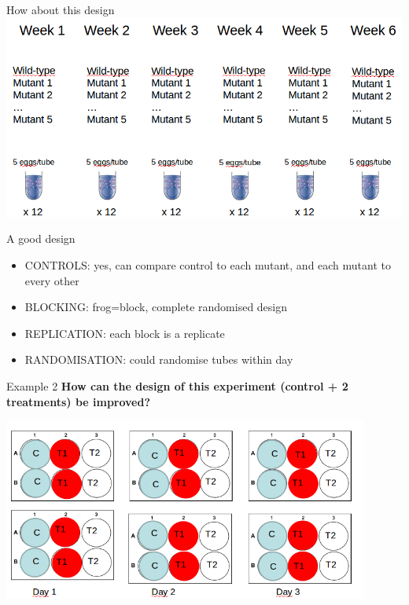 \documentclass[10pt]{beamer}
\begin{document}
\begin{frame}{How about this design}
 \includegraphics[width=\textwidth]{Figures/expdes4}
\end{frame}


\begin{frame}{A good design}
 \begin{alertblock}{}
 \begin{itemize}
  \item CONTROLS: yes, can compare control to each mutant, and each mutant to every other
  \item BLOCKING: frog=block, complete randomised design
  \item REPLICATION: each block is a replicate
  \item RANDOMISATION: could randomise tubes within day
 \end{itemize}
 \end{alertblock}
 
\end{frame}

\begin{frame}{Example 2}
 \textbf{How can the design of this experiment (control + 2 treatments) be improved?}
 
 \centering
 \includegraphics[width=0.9\textwidth]{Figures/expdesb}
\end{frame}
\end{document}
